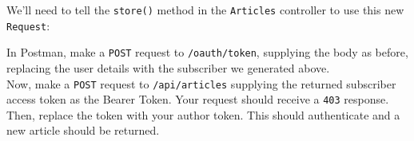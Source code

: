 
We'll need to tell the \texttt{store()} method in the \texttt{Articles} controller to use this new \texttt{Request}:



In Postman, make a \texttt{POST} request to \texttt{/oauth/token}, supplying the body as before, replacing the user details with the subscriber we generated above.
\\

Now, make a \texttt{POST} request to \texttt{/api/articles} supplying the returned subscriber access token as the Bearer Token. Your request should receive a \texttt{403} response. Then, replace the token with your author token. This should authenticate and a new article should be returned.
